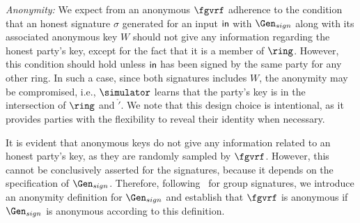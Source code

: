 	\smallskip
	\noindent \textit{Anonymity:} We expect from an anonymous $ \fgvrf $ adherence to the condition that an honest signature $\sigma$ generated for an input $\mathsf{in}$ with $ \Gen_{sign} $ along with its associated anonymous key $W$ should not give any information regarding the honest party's key, except for the fact that it is a member of $ \ring $.  However, this condition should hold unless $\mathsf{in}$ has been signed by the same party for any other  ring. In such a case,  since both signatures includes $ W $, the anonymity may be compromised,  i.e.,  $ \simulator $  learns that the party's key is in the intersection of $ \ring $ and $ \ring' $. We note that this design choice is intentional, as it provides parties with the flexibility to reveal their identity when necessary. 
		
	It is evident that anonymous keys do not give any information related to an honest party's key, as they are randomly sampled by $ \fgvrf $. However, this cannot be conclusively asserted for the signatures, because it depends on the specification of $ \Gen_{sign} $. Therefore, following~\cite{AtenieseCHM05} for group signatures, we introduce an anonymity definition  for $ \Gen_{sign} $ and establish that $ \fgvrf $ is anonymous if $ \Gen_{sign} $ is anonymous according to this definition.
	

